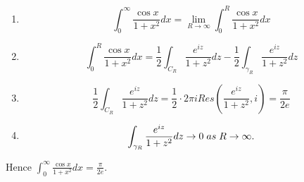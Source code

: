 \documentclass{article}
\begin{document}
\begin{enumerate}
\item \begin{equation*} \int_0^{\infty} \frac{\cos x}{1+x^2}dx = \lim_{R \to \infty} \int_0^R \frac{\cos x}{1+x^2}dx\end{equation*}
\item \begin{equation*} \int_0^R \frac{\cos x}{1+x^2}dx = \frac{1}{2} \int_{C_R} \frac{e^{iz}}{1+z^2}dz - \frac{1}{2} \int_{\gamma_R} \frac{e^{iz}}{1+z^2}dz \end{equation*}
\item \begin{equation*} \frac{1}{2} \int_{C_R} \frac{e^{iz}}{1+z^2}dz = \frac{1}{2} \cdot 2 \pi i Res(\frac{e^{iz}}{1+z^2},i) = \frac{\pi}{2e} \end{equation*}
\item \begin{equation*} \int_{\gamma_R} \frac{e^{iz}}{1+z^2}dz \to 0 \hspace{0.1cm} as \hspace{0.1cm} R \to \infty. \end{equation*}
\end{enumerate}
Hence $\int_0^{\infty} \frac{\cos x}{1+x^2}dx = \frac{\pi}{2e}$.
\end{document}
